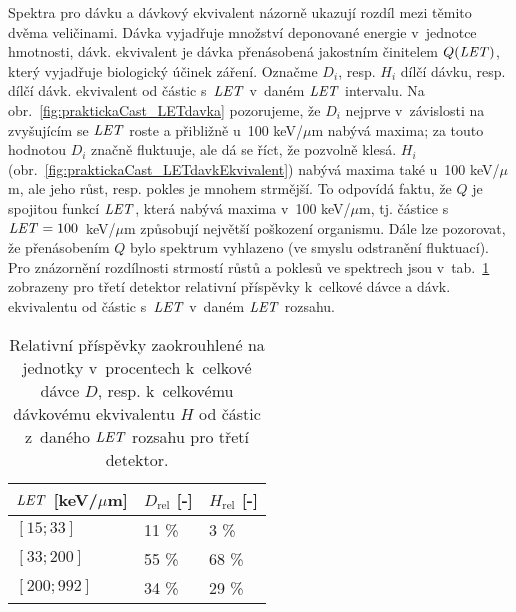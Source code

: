 Spektra pro dávku a dávkový ekvivalent názorně ukazují rozdíl mezi těmito dvěma veličinami. Dávka vyjadřuje množství deponované energie v~jednotce hmotnosti, dávk. ekvivalent je dávka přenásobená jakostním činitelem $Q(\mathit{LET})$, který vyjadřuje biologický účinek záření. Označme $D_i$, resp. $H_i$ dílčí dávku, resp. dílčí dávk. ekvivalent od částic s~$\mathit{LET}$ v~daném $\mathit{LET}$ intervalu. Na obr.~\ref{fig:praktickaCast_LETdavka} pozorujeme, že $D_i$ nejprve v~závislosti na zvyšujícím se $\mathit{LET}$ roste a přibližně u~100 keV/$\mu$m nabývá maxima; za touto hodnotou $D_i$ značně fluktuuje, ale dá se říct, že pozvolně klesá. $H_i$ (obr.~\ref{fig:praktickaCast_LETdavkEkvivalent}) nabývá maxima také u~100 keV/$\mu$m, ale jeho růst, resp. pokles je mnohem strmější. To odpovídá faktu, že $Q$ je spojitou funkcí $\mathit{LET}$,
která nabývá maxima v~100 keV/$\mu$m, tj. částice s~$\mathit{LET}=\nobreak100$~keV/$\mu$m způsobují největší poškození organismu. Dále lze pozorovat, že přenásobením $Q$ bylo spektrum vyhlazeno (ve smyslu odstranění fluktuací). Pro znázornění rozdílnosti strmostí růstů a poklesů ve spektrech jsou v~tab.~\ref{tab:praktickaCast_relPrispevkyDavka} zobrazeny pro třetí detektor relativní příspěvky k~celkové dávce a dávk. ekvivalentu od částic s~$\mathit{LET}$ v~daném $\mathit{LET}$ rozsahu.
\begin{table}[ht]
  \centering
  \caption{Relativní příspěvky zaokrouhlené na jednotky v~procentech k~celkové dávce $D$, resp. k~celkovému dávkovému ekvivalentu $H$ od částic z~daného $\mathit{LET}$ rozsahu pro třetí detektor.}
  \label{tab:praktickaCast_relPrispevkyDavka}
  \begin{tabular}{lll}
	\toprule
	$\mathit{LET}$ [keV/$\mu$m]& $D_{\text{rel}}$ [-]&$H_{\text{rel}}$ [-]\\
	\midrule
	$[15;33]$&11 \%&3 \%\\
	$[33;200]$&55 \%&68 \%\\
	$[200;992]$&34 \%&29 \%\\
	\bottomrule
  \end{tabular}
\end{table}

